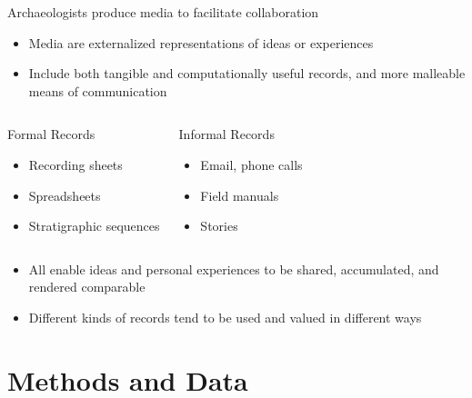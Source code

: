 \documentclass{beamer}
\begin{document}
\begin{frame}{Archaeologists produce media to facilitate collaboration}
  \begin{itemize}
    \item Media are externalized representations of ideas or experiences
    \item Include both tangible and computationally useful records, and more malleable means of communication
  \end{itemize}
  
  \begin{columns}[T,onlytextwidth]
      \begin{block}{Formal Records}
        \begin{itemize}
          \item Recording sheets
          \item Spreadsheets
          \item Stratigraphic sequences
        \end{itemize}
      \end{block}

      \begin{block}{Informal Records}
        \begin{itemize}
          \item Email, phone calls
          \item Field manuals
          \item Stories
        \end{itemize}
      \end{block}
  \end{columns}

  \begin{itemize}
    \item All enable ideas and personal experiences to be shared, accumulated, and rendered comparable
    \item Different kinds of records tend to be used and valued in different ways
  \end{itemize}
  
\end{frame}



\section{Methods and Data}
\end{document}
